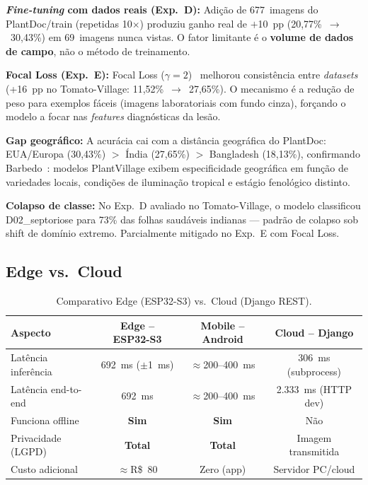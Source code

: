 \documentclass[12pt]{article}
\begin{document}
\textbf{\textit{Fine-tuning} com dados reais (Exp.~D):} Adição de 677~imagens do
PlantDoc/train (repetidas 10$\times$) produziu ganho real de $+$10~pp
(20,77\%~$\to$~30,43\%) em 69~imagens nunca vistas. O fator limitante é o
\textbf{volume de dados de campo}, não o método de treinamento.

\textbf{Focal Loss (Exp.~E):} Focal Loss ($\gamma=2$)~\cite{lin2017} melhorou
consistência entre \textit{datasets} (+16~pp no Tomato-Village: 11,52\%~$\to$~27,65\%).
O mecanismo é a redução de peso para exemplos fáceis (imagens laboratoriais com
fundo cinza), forçando o modelo a focar nas \textit{features} diagnósticas da lesão.

\textbf{Gap geográfico:} A acurácia cai com a distância geográfica do PlantDoc:
EUA/Europa (30,43\%) $>$ Índia (27,65\%) $>$ Bangladesh (18,13\%), confirmando
Barbedo~\cite{barbedo2019}: modelos PlantVillage exibem especificidade geográfica
em função de variedades locais, condições de iluminação tropical e estágio
fenológico distinto.

\textbf{Colapso de classe:} No Exp.~D avaliado no Tomato-Village, o modelo
classificou D02\_septoriose para 73\% das folhas saudáveis indianas --- padrão de
colapso sob shift de domínio extremo. Parcialmente mitigado no Exp.~E com Focal Loss.

\subsection{Edge vs.\ Cloud}

\begin{table}[ht]
\centering
\caption{Comparativo Edge (ESP32-S3) vs.\ Cloud (Django REST).}
\label{tab:edge}
\begin{tabular}{@{}lccc@{}}
\toprule
\textbf{Aspecto} & \textbf{Edge -- ESP32-S3} & \textbf{Mobile -- Android} & \textbf{Cloud -- Django} \\
\midrule
Latência inferência    & 692~ms ($\pm$1~ms) & $\approx$200--400~ms & 306~ms (subprocess) \\
Latência end-to-end    & 692~ms             & $\approx$200--400~ms & 2.333~ms (HTTP dev) \\
Funciona offline       & \textbf{Sim}       & \textbf{Sim}         & Não \\
Privacidade (LGPD)     & \textbf{Total}     & \textbf{Total}       & Imagem transmitida \\
Custo adicional        & $\approx$R\$~80    & Zero (app)           & Servidor PC/cloud \\
\bottomrule
\end{tabular}
\end{table}
\end{document}
